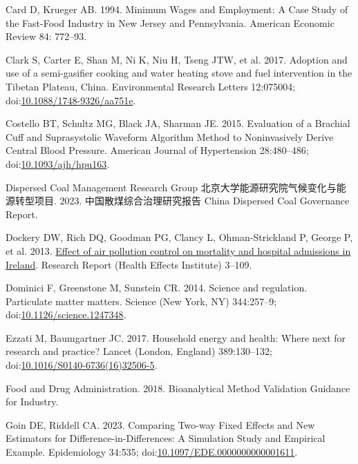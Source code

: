 \documentclass[
  letterpaper,
  DIV=11,
  numbers=noendperiod]{scrartcl}
\newlength{\cslhangindent}
\newlength{\cslentryspacingunit} %
\newenvironment{CSLReferences}[2] %
 {%
  \setlength{\parindent}{0pt}
  \ifodd #1
  \let\oldpar\par
  \def\par{\hangindent=\cslhangindent\oldpar}
  \fi
  \setlength{\parskip}{#2\cslentryspacingunit}
 }%
 {}
\begin{document}
\begin{CSLReferences}{1}{0}
\leavevmode{}%
Card D, Krueger AB. 1994. Minimum {Wages} and {Employment}: {A Case
Study} of the {Fast-Food Industry} in {New Jersey} and {Pennsylvania}.
American Economic Review 84: 772--93.

\leavevmode{}%
Clark S, Carter E, Shan M, Ni K, Niu H, Tseng JTW, et al. 2017. Adoption
and use of a semi-gasifier cooking and water heating stove and fuel
intervention in the {Tibetan Plateau}, {China}. Environmental Research
Letters 12:075004;
doi:\href{https://doi.org/10.1088/1748-9326/aa751e}{10.1088/1748-9326/aa751e}.

\leavevmode{}%
Costello BT, Schultz MG, Black JA, Sharman JE. 2015. Evaluation of a
{Brachial Cuff} and {Suprasystolic Waveform Algorithm Method} to
{Noninvasively Derive Central Blood Pressure}. American Journal of
Hypertension 28:480--486;
doi:\href{https://doi.org/10.1093/ajh/hpu163}{10.1093/ajh/hpu163}.

\leavevmode{}%
Dispersed Coal Management Research Group
北京大学能源研究院气候变化与能源转型项目. 2023. 中国散煤综合治理研究报告
{China Dispersed Coal Governance Report}.

\leavevmode{}%
Dockery DW, Rich DQ, Goodman PG, Clancy L, Ohman-Strickland P, George P,
et al. 2013. \href{https://www.ncbi.nlm.nih.gov/pubmed/24024358}{Effect
of air pollution control on mortality and hospital admissions in
{Ireland}}. Research Report (Health Effects Institute) 3--109.

\leavevmode{}%
Dominici F, Greenstone M, Sunstein CR. 2014. Science and regulation.
{Particulate} matter matters. Science (New York, NY) 344:257--9;
doi:\href{https://doi.org/10.1126/science.1247348}{10.1126/science.1247348}.

\leavevmode{}%
Ezzati M, Baumgartner JC. 2017. Household energy and health: Where next
for research and practice? Lancet (London, England) 389:130--132;
doi:\href{https://doi.org/10.1016/S0140-6736(16)32506-5}{10.1016/S0140-6736(16)32506-5}.

\leavevmode{}%
Food and Drug Administration. 2018. Bioanalytical {Method Validation
Guidance} for {Industry}.

\leavevmode{}%
Goin DE, Riddell CA. 2023. Comparing {Two-way Fixed Effects} and {New
Estimators} for {Difference-in-Differences}: {A Simulation Study} and
{Empirical Example}. Epidemiology 34:535;
doi:\href{https://doi.org/10.1097/EDE.0000000000001611}{10.1097/EDE.0000000000001611}.


\end{CSLReferences}
\end{document}
